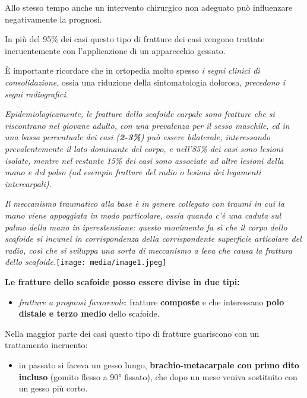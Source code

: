 \documentclass[]{article}
\begin{document}
Allo stesso tempo anche un intervento chirurgico non adeguato può
influenzare negativamente la prognosi.

In più del 95\% dei casi questo tipo di fratture dei casi vengono
trattate incruentemente con l'applicazione di un apparecchio gessato.

È importante ricordare che in ortopedia molto spesso \emph{i segni
clinici di consolidazione}, ossia una riduzione della sintomatologia
dolorosa, \emph{precedono i segni radiografici}.

\emph{Epidemiologicamente, le fratture dello scafoide carpale sono
fratture che si riscontrano nel \emph{giovane adulto}, con una
prevalenza per il \emph{sesso maschile}, ed in una bassa percentuale dei
casi (\textbf{2-3\%}) può essere \emph{bilaterale}, interessando
prevalentemente il lato dominante del corpo, e nell'85\% dei casi sono
lesioni isolate, mentre nel restante 15\% dei casi sono associate ad
altre lesioni della mano e del polso (ad esempio fratture del radio o
lesioni dei legamenti intercarpali).}

\emph{Il meccanismo traumatico alla base è in genere collegato con
\emph{traumi in cui la mano viene appoggiata in modo particolare, ossia
quando c'è una caduta sul palmo della mano in iperestensione}: questo
movimento fa sì che il corpo dello scafoide si incunei in corrispondenza
della corrispondente superficie articolare del radio, così che si
sviluppa una sorta di meccanismo a leva che causa la frattura dello
scafoide.}\texttt{[image: media/image1.jpeg]}

\textbf{Le fratture dello scafoide posso essere divise in due tipi:}

\begin{itemize}
\item
  \emph{fratture a prognosi favorevole}: fratture \textbf{composte} e
  che interessano \textbf{polo distale e terzo medio} dello scafoide.
\end{itemize}

Nella maggior parte dei casi questo tipo di fratture guariscono con un
trattamento incruento:

\begin{itemize}
\item
  in passato si faceva un gesso lungo, \textbf{brachio-metacarpale con
  primo dito incluso} (gomito flesso a 90° fissato), che dopo un mese
  veniva sostituito con un gesso più corto.
\end{itemize}
\end{document}
